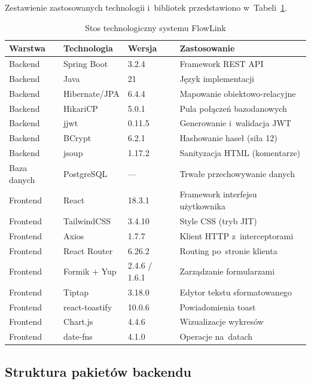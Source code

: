 \noindent Zestawienie zastosowanych technologii i~bibliotek przedstawiono w~Tabeli~\ref{tab:tech_stack}.

\begin{table}[H]
\centering
\caption{Stos technologiczny systemu FlowLink}
\label{tab:tech_stack}
\begin{tabular}{|l|l|l|l|}
\hline
\textbf{Warstwa} & \textbf{Technologia} & \textbf{Wersja} & \textbf{Zastosowanie} \\ \hline
Backend & Spring Boot & 3.2.4 & Framework REST API \\ \hline
Backend & Java & 21 & Język implementacji \\ \hline
Backend & Hibernate/JPA & 6.4.4 & Mapowanie obiektowo-relacyjne \\ \hline
Backend & HikariCP & 5.0.1 & Pula połączeń bazodanowych \\ \hline
Backend & jjwt & 0.11.5 & Generowanie i~walidacja JWT \\ \hline
Backend & BCrypt & 6.2.1 & Hashowanie haseł (siła 12) \\ \hline
Backend & jsoup & 1.17.2 & Sanityzacja HTML (komentarze) \\ \hline
Baza danych & PostgreSQL & --- & Trwałe przechowywanie danych \\ \hline
Frontend & React & 18.3.1 & Framework interfejsu użytkownika \\ \hline
Frontend & TailwindCSS & 3.4.10 & Style CSS (tryb JIT) \\ \hline
Frontend & Axios & 1.7.7 & Klient HTTP z~interceptorami \\ \hline
Frontend & React Router & 6.26.2 & Routing po~stronie klienta \\ \hline
Frontend & Formik + Yup & 2.4.6 / 1.6.1 & Zarządzanie formularzami \\ \hline
Frontend & Tiptap & 3.18.0 & Edytor tekstu sformatowanego \\ \hline
Frontend & react-toastify & 10.0.6 & Powiadomienia toast \\ \hline
Frontend & Chart.js & 4.4.6 & Wizualizacje wykresów \\ \hline
Frontend & date-fns & 4.1.0 & Operacje na~datach \\ \hline
\end{tabular}
\end{table}

\subsection{Struktura pakietów backendu}

